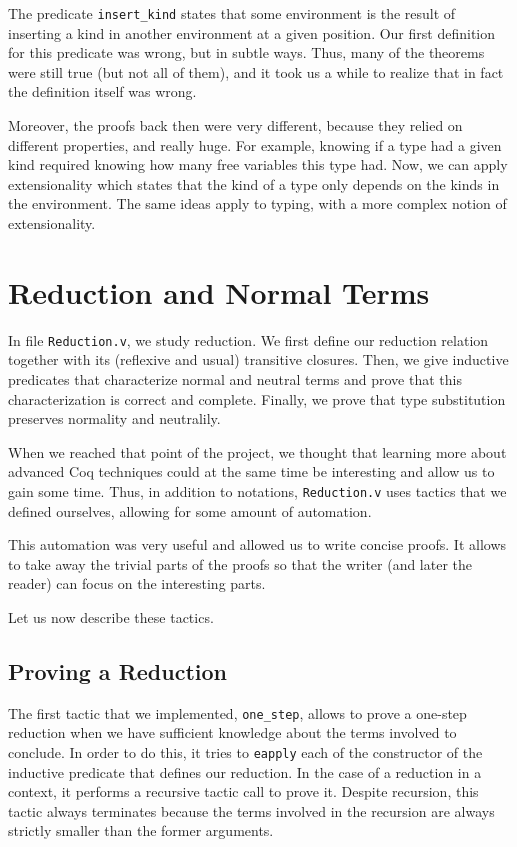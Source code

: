 \documentclass[a4paper,11pt]{article}
\begin{document}
The predicate \verb|insert_kind| states that some environment is the
result of inserting a kind in another environment at a given position.
Our first definition for this predicate was wrong, but in subtle
ways. Thus, many of the theorems were still true (but not all of
them), and it took us a while to realize that in fact the definition
itself was wrong.

Moreover, the proofs back then were very different, because they
relied on different properties, and really huge. For example,
knowing if a type had a given kind required knowing how many free
variables this type had. Now, we can apply extensionality which
states that the kind of a type only depends on the kinds in the
environment. The same ideas apply to typing, with a more complex
notion of extensionality.

\section{Reduction and Normal Terms}

In file \verb|Reduction.v|, we study reduction. We first define our
reduction relation together with its (reflexive and usual) transitive
closures. Then, we give inductive predicates that characterize normal
and neutral terms and prove that this characterization is correct and
complete. Finally, we prove that type substitution preserves normality
and neutralily.

When we reached that point of the project, we thought that learning
more about advanced Coq techniques could at the same time be
interesting and allow us to gain some time. Thus, in addition to
notations, \verb|Reduction.v| uses tactics that we defined ourselves,
allowing for some amount of automation.

This automation was very useful and allowed us to write concise
proofs. It allows to take away the trivial parts of the proofs so that
the writer (and later the reader) can focus on the interesting parts.

Let us now describe these tactics.

\subsection{Proving a Reduction}

The first tactic that we implemented, \verb|one_step|, allows to prove
a one-step reduction when we have sufficient knowledge about the terms
involved to conclude. In order to do this, it tries to \verb|eapply|
each of the constructor of the inductive predicate that defines our
reduction. In the case of a reduction in a context, it performs a
recursive tactic call to prove it. Despite recursion, this tactic
always terminates because the terms involved in the recursion are
always strictly smaller than the former arguments.
\end{document}
